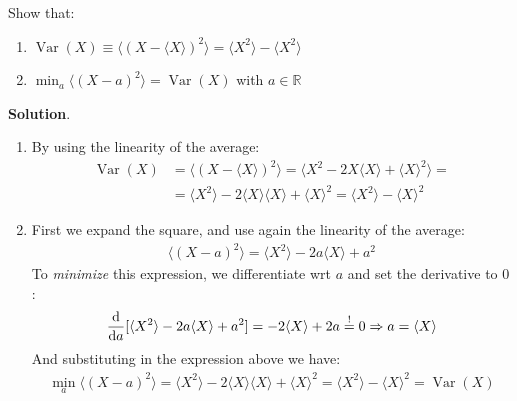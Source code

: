 \documentclass[../template.tex]{subfiles}
\begin{document}
\begin{exo}
\end{exo}

\begin{exo}
    Show that:
    \begin{enumerate}
        \item $\operatorname{Var}(X) \equiv \langle (X-\langle X \rangle)^2 \rangle = \langle X^2 \rangle - \langle X^2 \rangle$
        \item $\displaystyle \min_a \langle (X-a)^2 \rangle = \operatorname{Var}(X)$ with $a \in \mathbb{R}$ 
    \end{enumerate}
    
    \medskip

    \textbf{Solution}.
    \begin{enumerate}
        \item By using the linearity of the average:
        \begin{align*}
            \operatorname{Var}(X) &= \langle (X - \langle X \rangle)^2 \rangle = \langle X^2 -  2 X \langle X \rangle + \langle X \rangle^2\rangle = \\
            &=\langle X^2 \rangle - 2 \langle X \rangle \langle X \rangle + \langle X \rangle^2 = \langle X^2 \rangle - \langle X \rangle^2
        \end{align*}
        \item First we expand the square, and use again the linearity of the average:
        \begin{align*}
            \langle (X-a)^2 \rangle = \langle X^2 \rangle - 2a \langle X \rangle + a^2
        \end{align*}
        To \textit{minimize} this expression, we differentiate wrt $a$ and set the derivative to $0$:
        \begin{align*}
            \dv{a} [\langle X^2 \rangle -2a \langle X \rangle + a^2] = -2 \langle X \rangle + 2a \overset{!}{=} 0 \Rightarrow a = \langle X \rangle
        \end{align*} 
        And substituting in the expression above we have:
        \begin{align*}
            \min_a \langle (X-a)^2 \rangle = \langle X^2 \rangle - 2 \langle X \rangle \langle X \rangle + \langle X \rangle^2 = \langle X^2 \rangle-\langle X \rangle^2 = \operatorname{Var}(X) 
        \end{align*}
    \end{enumerate}
     
\end{exo}
\end{document}

